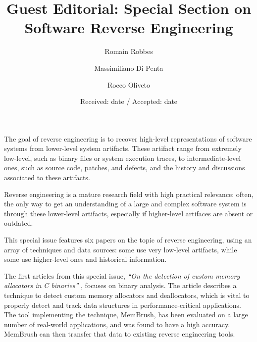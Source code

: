 \documentclass{svjour3}                     %
\begin{document}
\title{Guest Editorial: Special Section on Software Reverse Engineering}

\author{Romain Robbes \and Massimiliano Di Penta \and Rocco Oliveto}
\date{Received: date / Accepted: date}


\maketitle

The goal of reverse engineering is to recover high-level representations of software systems from lower-level system artifacts. These artifact range from extremely low-level, such as binary files or system execution traces, to intermediate-level ones, such as source code, patches, and defects, and the history and discussions associated to these artifacts. 

Reverse engineering is a mature research field with high practical relevance: often, the only way to get an understanding of a large and complex software system is through these lower-level artifacts, especially if higher-level artifaces are absent or outdated.

This special issue features six papers on the topic of reverse engineering, using an array of techniques and data sources: some use very low-level artifacts, while some use higher-level ones and historical information.

The first articles from this special issue, \emph{``On the detection of custom memory allocators in C binaries''} \cite{memory}, focuses on binary analysis. The article describes a technique to detect custom memory allocators and deallocators, which is vital to properly detect and track data structures in performance-critical applications. The tool implementing the technique, MemBrush, has been evaluated on a large number of real-world applications, and was found to have a high accuracy. MemBrush can then transfer that data to existing reverse engineering tools. 
\end{document}
